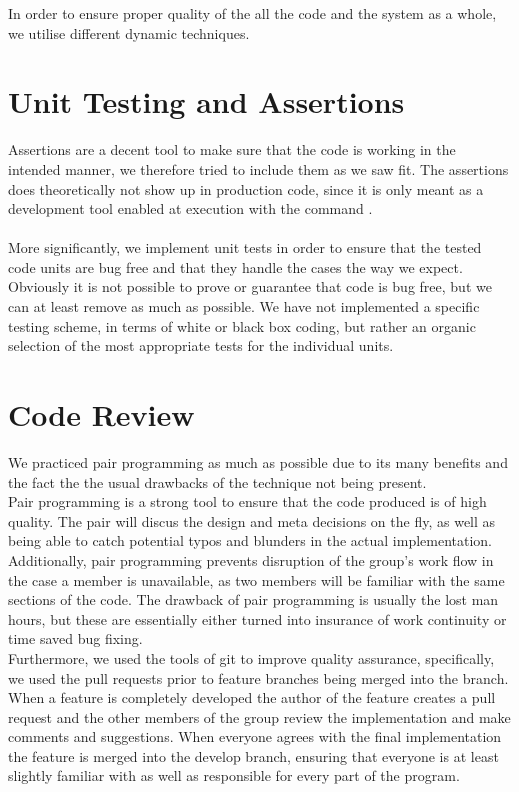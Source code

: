 In order to ensure proper quality of the all the code and the system as a whole, we utilise different dynamic techniques.

\section{Unit Testing and Assertions}
Assertions are a decent tool to make sure that the code is working in the intended manner, we therefore tried to include them as we saw fit. The assertions does theoretically not show up in production code, since it is only meant as a development tool enabled at execution with the command .
\\ \\
More significantly, we implement unit tests in order to ensure that the tested code units are bug free and that they handle the cases the way we expect. Obviously it is not possible to prove or guarantee that code is bug free, but we can at least remove as much as possible. We have not implemented a specific testing scheme, in terms of white or black box coding, but rather an organic selection of the most appropriate tests for the individual units.

\section{Code Review}
We practiced pair programming as much as possible due to its many benefits and the fact the the usual drawbacks of the technique not being present. \\
Pair programming is a strong tool to ensure that the code produced is of high quality. The pair will discus the design and meta decisions on the fly, as well as being able to catch potential typos and blunders in the actual implementation. Additionally, pair programming prevents disruption of the group's work flow in the case a member is unavailable, as two members will be familiar with the same sections of the code. The drawback of pair programming is usually the lost man hours, but these are essentially either turned into insurance of work continuity or time saved bug fixing. \\
Furthermore, we used the tools of git to improve quality assurance, specifically, we used the pull requests prior to feature branches being merged into the  branch. When a feature is completely developed the author of the feature creates a pull request and the other members of the group review the implementation and make comments and suggestions. When everyone agrees with the final implementation the feature is merged into the develop branch, ensuring that everyone is at least slightly familiar with as well as responsible for every part of the program.

